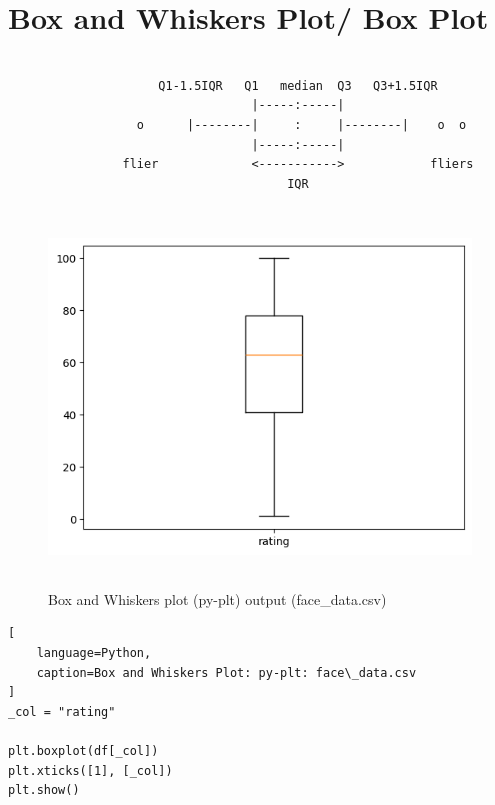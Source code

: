 \section{Box and Whiskers Plot/ Box Plot \cite{data/online/seaborn.boxplot, data/online/matplotlib.pyplot.boxplot}} \label{Visualizing Data/Box and Whiskers Plot or Box Plot}

\begin{lstlisting}[numbers=none]

                     Q1-1.5IQR   Q1   median  Q3   Q3+1.5IQR
                                  |-----:-----|
                  o      |--------|     :     |--------|    o  o
                                  |-----:-----|
                flier             <----------->            fliers
                                       IQR

\end{lstlisting}

\vspace{0.5cm}

\begin{table}[H]
\begin{minipage}[t]{0.35\linewidth}
\begin{figure}[H]
    \centering
    \includegraphics[width=0.9\linewidth, height=10cm, keepaspectratio]{images/data/__visualizations__/plt-box-rating-face-data.png}
    \caption{Box and Whiskers plot (py-plt) output (face\_data.csv)}
\end{figure}
\end{minipage}
\hspace{0.2cm}
\vrule width 1pt
\hspace{0.5cm}
\begin{minipage}[t]{0.57\linewidth}
\begin{lstlisting}[
    language=Python,
    caption=Box and Whiskers Plot: py-plt: face\_data.csv
]
_col = "rating"

plt.boxplot(df[_col])
plt.xticks([1], [_col])
plt.show()
\end{lstlisting}
\end{minipage}
\end{table}



